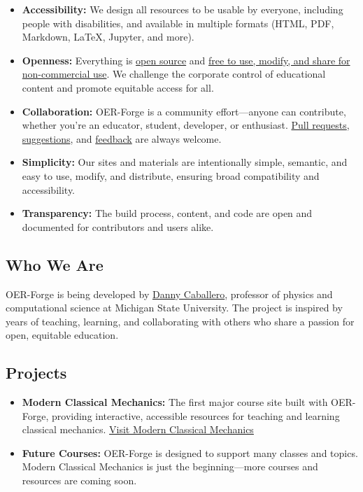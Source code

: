 \begin{itemize}
\tightlist
\item
  \textbf{Accessibility:} We design all resources to be usable by
  everyone, including people with disabilities, and available in
  multiple formats (HTML, PDF, Markdown, LaTeX, Jupyter, and more).
\item
  \textbf{Openness:} Everything is
  \href{https://github.com/OER-Forge}{open source} and
  \href{https://github.com/OER-Forge/OER-Forge/blob/main/LICENSE}{free
  to use, modify, and share for non-commercial use}. We challenge the
  corporate control of educational content and promote equitable access
  for all.
\item
  \textbf{Collaboration:} OER-Forge is a community effort---anyone can
  contribute, whether you're an educator, student, developer, or
  enthusiast. \href{https://github.com/OER-Forge/OER-Forge/pulls}{Pull
  requests},
  \href{https://github.com/OER-Forge/OER-Forge/issues}{suggestions}, and
  \href{mailto:hello@oerforge.org}{feedback} are always welcome.
\item
  \textbf{Simplicity:} Our sites and materials are intentionally simple,
  semantic, and easy to use, modify, and distribute, ensuring broad
  compatibility and accessibility.
\item
  \textbf{Transparency:} The build process, content, and code are open
  and documented for contributors and users alike.
\end{itemize}

\subsection{Who We Are}\label{who-we-are}

OER-Forge is being developed by \href{https://dannycab.github.io/}{Danny
Caballero}, professor of physics and computational science at Michigan
State University. The project is inspired by years of teaching,
learning, and collaborating with others who share a passion for open,
equitable education.

\subsection{Projects}\label{projects}

\begin{itemize}
\tightlist
\item
  \textbf{Modern Classical Mechanics:} The first major course site built
  with OER-Forge, providing interactive, accessible resources for
  teaching and learning classical mechanics.
  \href{https://dannycaballero.info/modern-classical-mechanics/}{Visit
  Modern Classical Mechanics}
\item
  \textbf{Future Courses:} OER-Forge is designed to support many classes
  and topics. Modern Classical Mechanics is just the beginning---more
  courses and resources are coming soon.
\end{itemize}

